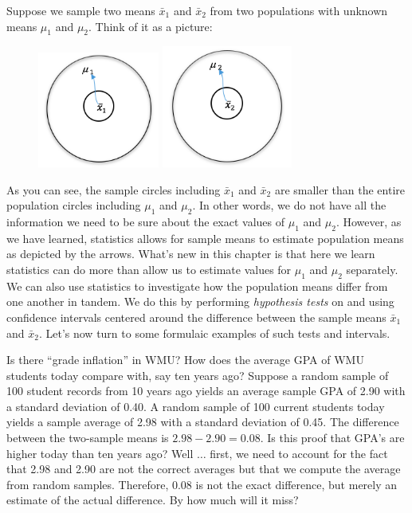 \documentclass[11pt, chapterprefix=true]{scrbook}\usepackage[]{graphicx}\usepackage[]{color}
\begin{document}
Suppose we sample two means $\bar{x}_1$ and $\bar{x}_2$  from two populations with unknown means $\mu_1$ and $\mu_2$. Think of it as a picture:

\begin{figure}[ht]
\centering
\includegraphics[width=4cm]{chapters/Chapter_12/ext_figure/x1.png} %
\includegraphics[width=4.3cm]{chapters/Chapter_12/ext_figure/x2.png} %
\end{figure}

As you can see, the sample circles including $\bar{x}_1$ and $\bar{x}_2$ are smaller than the entire population circles including $\mu_1$ and $\mu_2$. In other words, we do not have all the information we need to be sure about the exact values of  $\mu_1$ and $\mu_2$. However, as we have learned, statistics allows for sample means to estimate population means as depicted by the arrows. What's new in this chapter is that here we learn statistics can do more than allow us to estimate values for $\mu_1$ and $\mu_2$ separately. We can also use statistics to investigate how the population means differ from one another in tandem. We do this by performing \textit{hypothesis tests} on and using confidence intervals centered around the difference between the sample means $\bar{x}_1$ and $\bar{x}_2$. Let's now turn to some formulaic examples of such tests and intervals.

Is there ``grade inflation'' in WMU?  How does the average GPA of WMU students today compare with, say ten years ago?  Suppose a random sample of 100 student records from 10 years ago yields an average sample GPA of 2.90 with a standard deviation of 0.40.  A random sample of 100 current students today yields a sample average of 2.98 with a standard deviation of 0.45.  The difference between the two-sample means is $2.98 - 2.90 = 0.08$.  Is this proof that GPA's are higher today than ten years ago?  Well $\dots$ first, we need to account for the fact that 2.98 and 2.90 are not the correct averages but that we compute the average from random samples.  Therefore, 0.08 is not the exact difference, but merely an estimate of the actual difference. By how much will it miss?
\end{document}
